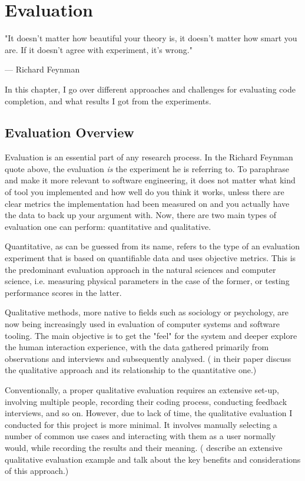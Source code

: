\chapter{Evaluation}
\label{chap:Evaluation}

\epigraph{"It doesn't matter how beautiful your theory is, it doesn't matter how smart you are. If it doesn't agree with experiment, it's wrong."}{--- \textup{Richard Feynman}}

In this chapter, I go over different approaches and challenges for evaluating code completion, and what results I got from the experiments.

\section{Evaluation Overview}
\label{sec:Evaluation-Overview}
Evaluation is an essential part of any research process. In the Richard Feynman quote above, the evaluation \textit{is} the experiment he is referring to. To paraphrase and make it more relevant to software engineering, it does not matter what kind of tool you implemented and how well do you think it works, unless there are clear metrics the implementation had been measured on and you actually have the data to back up your argument with. Now, there are two main types of evaluation one can perform: quantitative and qualitative.

Quantitative, as can be guessed from its name, refers to the type of an evaluation experiment that is based on quantifiable data and uses objective metrics. This is the predominant evaluation approach in the natural sciences and computer science, i.e. measuring physical parameters in the case of the former, or testing performance scores in the latter.

Qualitative methods, more native to fields such as sociology or psychology, are now being increasingly used in evaluation of computer systems and software tooling. The main objective is to get the "feel" for the system and deeper explore the human interaction experience, with the data gathered primarily from observations and interviews and subsequently analysed. (\cite{Hazz06a} in their paper discuss the qualitative approach and its relationship to the quantitative one.)

Conventionally, a proper qualitative evaluation requires an extensive set-up, involving multiple people, recording their coding process, conducting feedback interviews, and so on. However, due to lack of time, the qualitative evaluation I conducted for this project is more minimal. It involves manually selecting a number of common use cases and interacting with them as a user normally would, while recording the results and their meaning. (\cite{Kapl05a} describe an extensive qualitative evaluation example and talk about the key benefits and considerations of this approach.)

